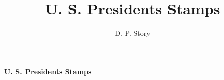 \documentclass{article}
\title{U. S. Presidents Stamps}
\author{D. P. Story}
\begin{document}
\null\vfil
\begin{center}
\huge\sffamily\bfseries U. S. Presidents Stamps
\end{center}
\vfil
\end{document}
